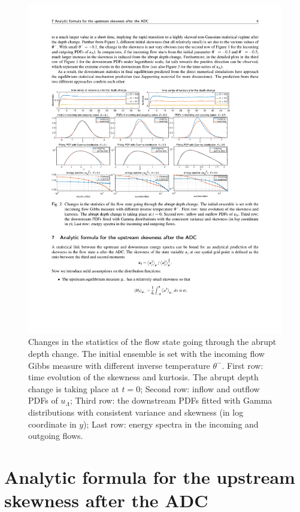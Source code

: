 \documentclass[9pt,twocolumn,twoside,lineno]{pnas-new}
\begin{document}
\begin{figure}
\centering
\includegraphics[scale=.9]{./fig2}

\caption{Changes in the statistics of the flow state going through the abrupt
depth change. The initial ensemble is set with the incoming flow Gibbs
measure with different inverse temperature $\theta^{-}$. First row:
time evolution of the skewness and kurtosis. The abrupt depth change
is taking place at $t=0$; Second row: inflow and outflow PDFs of
$u_{\Lambda}$; Third row: the downstream PDFs fitted with Gamma distributions
with consistent variance and skewness (in log coordinate in $y$);
Last row: energy spectra in the incoming and outgoing flows.\label{fig:Changes-stats}}
\end{figure}

\section{Analytic formula for the upstream skewness after the ADC}
\end{document}
